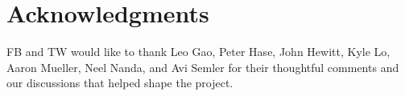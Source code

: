 \section*{Acknowledgments}
FB and TW would like to thank Leo Gao, Peter Hase, John Hewitt, Kyle Lo, Aaron Mueller, Neel Nanda, and Avi Semler for their thoughtful comments and our discussions that helped shape the project.
